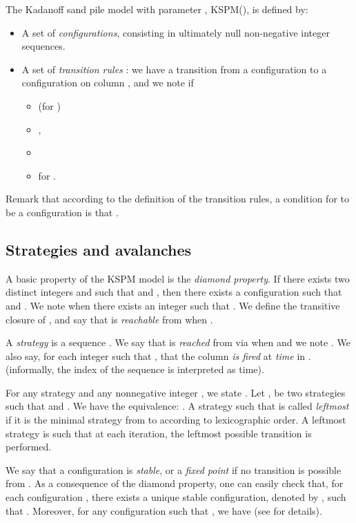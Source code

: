 \documentclass[11pt,a4paper]{llncs}
\begin{document}
\begin{definition}
The   Kadanoff sand pile model with parameter , KSPM(), is defined by:
  \begin{itemize}
    \item A set of \emph{configurations}, consisting in ultimately null non-negative integer sequences.
    \item A set of \emph{transition rules} : we have a transition from a configuration  to a configuration  on column , and we note    if  
    \begin{itemize}
\item  (for )
\item , 
\item 
\item  for . 
\end{itemize}

  \end{itemize}
\end{definition}

Remark that according to the definition of the transition rules, a condition for  to be a configuration is that .

\subsection{Strategies and avalanches}


A basic property of the KSPM model is the \emph{diamond property}. If there exists two distinct integers  and  such that 
 and , then there exists a configuration  such that   and . 
We  note  when there exists an integer  such that . 
We define the transitive closure  of , and say that  is {\em reachable} from  when  .

A {\em strategy} is a sequence . We say that  is {\em reached} from  via  when  and we note . 
We also say,  for each integer  such that , that the column  \emph{is fired} at \emph{time}  in . (informally,  the index of the sequence is interpreted as time). 

 For any strategy  and any nonnegative integer , we state .  Let   ,  be  two strategies such that  and .  We have the equivalence:  .
 A strategy  such that  is called {\em leftmost} if it is the minimal strategy from  to  according to lexicographic order. A leftmost strategy is such that at each iteration, the leftmost possible transition is performed. 

We say that a configuration  is \emph{stable}, or a \emph{fixed point} if no transition is possible from . 
As a  consequence of the diamond property, one can easily check that, for each configuration , there exists a unique stable configuration, denoted by , such that  . Moreover,  for any  
configuration  such that , we have  (see \cite{goles02} for details). 
\end{document}
